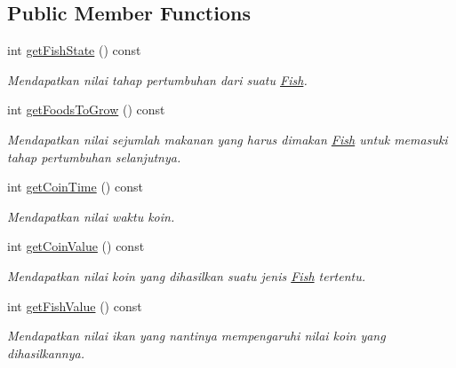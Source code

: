 \subsection*{Public Member Functions}
\begin{DoxyCompactItemize}
\item 
\mbox{\label{classFish_ab9c2e99efae1e293e660b02dfd6b3ec3}} 
int \hyperlink{classFish_ab9c2e99efae1e293e660b02dfd6b3ec3}{get\+Fish\+State} () const
\begin{DoxyCompactList}\small\item\em Mendapatkan nilai tahap pertumbuhan dari suatu \hyperlink{classFish}{Fish}. \end{DoxyCompactList}\item 
\mbox{\label{classFish_a6fec94dae5da20c2649e5cb4eab6288b}} 
int \hyperlink{classFish_a6fec94dae5da20c2649e5cb4eab6288b}{get\+Foods\+To\+Grow} () const
\begin{DoxyCompactList}\small\item\em Mendapatkan nilai sejumlah makanan yang harus dimakan \hyperlink{classFish}{Fish} untuk memasuki tahap pertumbuhan selanjutnya. \end{DoxyCompactList}\item 
\mbox{\label{classFish_aaeaf482b0fe949b02cd938dec4f4212d}} 
int \hyperlink{classFish_aaeaf482b0fe949b02cd938dec4f4212d}{get\+Coin\+Time} () const
\begin{DoxyCompactList}\small\item\em Mendapatkan nilai waktu koin. \end{DoxyCompactList}\item 
\mbox{\label{classFish_a111347fa2d2fb3ff52c697dd05ff2794}} 
int \hyperlink{classFish_a111347fa2d2fb3ff52c697dd05ff2794}{get\+Coin\+Value} () const
\begin{DoxyCompactList}\small\item\em Mendapatkan nilai koin yang dihasilkan suatu jenis \hyperlink{classFish}{Fish} tertentu. \end{DoxyCompactList}\item 
\mbox{\label{classFish_a44f14e2464641108fde598d13021e58a}} 
int \hyperlink{classFish_a44f14e2464641108fde598d13021e58a}{get\+Fish\+Value} () const
\begin{DoxyCompactList}\small\item\em Mendapatkan nilai ikan yang nantinya mempengaruhi nilai koin yang dihasilkannya. \end{DoxyCompactList}\item 

\end{DoxyCompactItemize}
